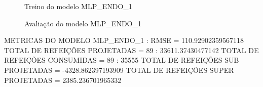 \documentclass[	12pt, Times, openright, twoside, a4paper, english, brazil]{abntex2}
\begin{document}
                \begin{figure}[!ht]
                  \caption{Treino do modelo MLP\_ENDO\_1 \label{fig:case1_mlp_endo1_train} }
                \end{figure}

                \begin{figure}[!ht]
                  \caption{Avaliação do modelo MLP\_ENDO\_1 \label{fig:case1_mlp_endo1_val} }
                \end{figure}
                METRICAS DO MODELO MLP\_ENDO\_1 : \newline
                RMSE = 110.92902359567118\newline
                TOTAL DE REFEIÇÕES PROJETADAS = 89 : 33611.37430477142\newline
                TOTAL DE REFEIÇÕES CONSUMIDAS = 89 : 35555\newline
                TOTAL DE REFEIÇÕES SUB PROJETADAS = -4328.862397193909\newline
                TOTAL DE REFEIÇÕES SUPER PROJETADAS = 2385.236701965332\newline

\end{document}
